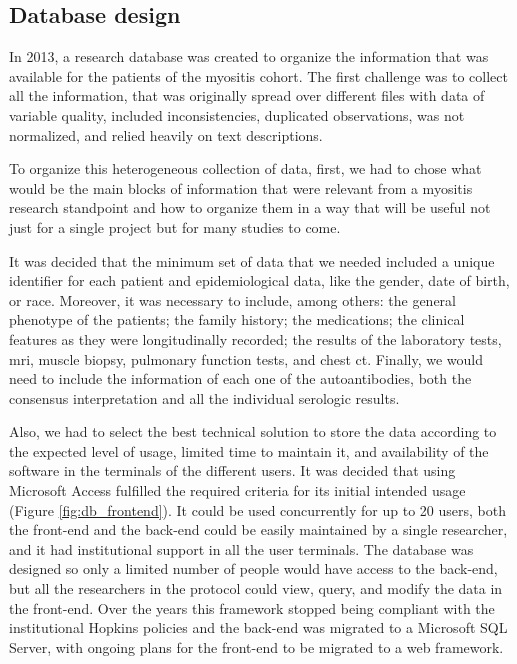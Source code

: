 \subsection{Database design}

In 2013, a research database was created to organize the information that was available for the patients of the myositis cohort. The first challenge was to collect all the information, that was originally spread over different files with data of variable quality, included inconsistencies, duplicated observations, was not normalized, and relied heavily on text descriptions.

To organize this heterogeneous collection of data, first, we had to chose what would be the main blocks of information that were relevant from a myositis research standpoint and how to organize them in a way that will be useful not just for a single project but for many studies to come.

It was decided that the minimum set of data that we needed included a unique identifier for each patient and epidemiological data, like the gender, date of birth, or race. Moreover, it was necessary to include, among others: the general phenotype of the patients; the family history; the medications; the clinical features as they were longitudinally recorded; the results of the laboratory tests, \gls{mri}, muscle biopsy, pulmonary function tests, and chest \gls{ct}. Finally, we would need to include the information of each one of the autoantibodies, both the consensus interpretation and all the individual serologic results.

Also, we had to select the best technical solution to store the data according to the expected level of usage, limited time to maintain it, and availability of the software in the terminals of the different users. It was decided that using Microsoft Access fulfilled the required criteria for its initial intended usage (Figure \ref{fig:db_frontend}). It could be used concurrently for up to 20 users, both the front-end and the back-end could be easily maintained by a single researcher, and it had institutional support in all the user terminals. The database was designed so only a limited number of people would have access to the back-end, but all the researchers in the protocol could view, query, and modify the data in the front-end. Over the years this framework stopped being compliant with the institutional Hopkins policies and the back-end was migrated to a Microsoft SQL Server, with ongoing plans for the front-end to be migrated to a web framework.

